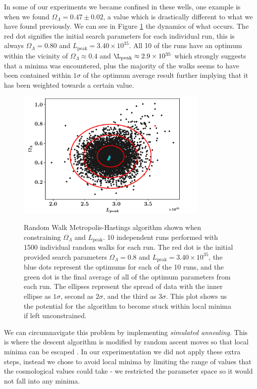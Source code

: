 \documentclass[twocolumn]{revtex4}
\begin{document}
{In some of our experiments we became confined in these wells, one example is when we found $\Omega_\Lambda=0.47\pm0.02$, a value which is drastically different to what we have found previously. We can see in Figure \ref{fig:mcmc_search} the dynamics of what occurs. The red dot signifies the initial search parameters for each individual run, this is always $\Omega_\Lambda=0.80$ and $L_\text{peak}=3.40\times10^{35}$. All 10 of the runs have an optimum within the vicinity of $\Omega_\Lambda \approx 0.4$ and $\L_\text{peak}\approx2.9\times10^{35}$ which strongly suggests that a minima was encountered, plus the majority of the walks seems to have been contained within $1\sigma$ of the optimum average result further implying that it has been weighted towards a certain value.

\begin{figure}[!h]
\begin{center}
\includegraphics[width=9.25cm]{results/ol_lp_complete}
\caption[]{Random Walk Metropolis-Hastings algorithm shown when constraining $\Omega_\Lambda$ and $L_\text{peak}$. 10 independent runs performed with 1500 individual random walks for each run. The red dot is the initial provided search parameters $\Omega_\Lambda=0.8$ and $L_\text{peak}=3.40\times10^{35}$, the blue dots represent the optimums for each of the 10 runs, and the green dot is the final average of all of the optimum parameters from each run. The ellipses represent the spread of data with the inner ellipse as $1\sigma$, second as $2\sigma$, and the third as $3\sigma$. This plot shows us the potential for the algorithm to become stuck within local minima if left unconstrained. }
\vspace{-3ex}
\label{fig:mcmc_search}
\end{center}
\end{figure}

We can circumnavigate this problem by implementing \textit{simulated annealing}. This is where the descent algorithm is modified by random ascent moves so that local minima can be escaped \cite{simulated_annealing}. In our experimentation we did not apply these extra steps, instead we chose to avoid local minima by limiting the range of values that the cosmological values could take - we restricted the parameter space so it would not fall into any minima. 

}
\end{document}
